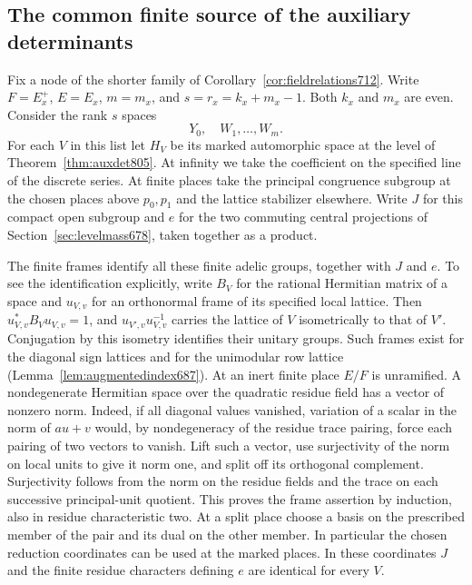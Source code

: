 \documentclass[a4paper,11pt]{article}
\theoremstyle{definition}
\theoremstyle{remark}
\numberwithin{equation}{section}
\begin{document}
\subsection{The common finite source of the auxiliary determinants}
\label{sec:commonsource806}
Fix a node of the shorter family of Corollary~\ref{cor:fieldrelations712}.
Write \(F=E_x^+\), \(E=E_x\), \(m=m_x\), and \(s=r_x=k_x+m_x-1\).
Both \(k_x\) and \(m_x\) are even. Consider the rank \(s\) spaces
\[
                         Y_0,\quad W_1,\ldots,W_m .
\]
For each \(V\) in this list let \(H_V\) be its marked automorphic
space at the level of Theorem~\ref{thm:auxdet805}. At infinity
we take the coefficient on the specified line of the discrete
series. At finite places take the principal congruence subgroup
at the chosen places above \(p_0,p_1\) and the lattice stabilizer
elsewhere. Write \(J\) for this compact open subgroup and \(e\)
for the two commuting central projections of
Section~\ref{sec:levelmass678}, taken together as a product.

The finite frames identify all these finite adelic groups, together
with \(J\) and \(e\). To see the identification explicitly, write
\(B_V\) for the rational Hermitian matrix of a space and \(u_{V,v}\)
for an orthonormal frame of its specified local lattice. Then
\(u_{V,v}^{*} B_V u_{V,v}=1\), and
\(u_{V',v}u_{V,v}^{-1}\) carries the lattice of \(V\) isometrically
to that of \(V'\). Conjugation by this isometry identifies their
unitary groups. Such frames exist for the diagonal sign lattices
and for the unimodular row lattice
(Lemma~\ref{lem:augmentedindex687}). At an inert finite place
\(E/F\) is unramified. A nondegenerate Hermitian space over
the quadratic residue field has a vector of nonzero norm.
Indeed, if all diagonal values vanished, variation of a scalar
in the norm of \(a u+v\) would, by nondegeneracy of the residue
trace pairing, force each pairing of two vectors to vanish.
Lift such a vector, use surjectivity of the norm on local units
to give it norm one, and split off its orthogonal complement.
Surjectivity follows from the norm on the residue fields and the
trace on each successive principal-unit quotient. This proves
the frame assertion by induction, also in residue characteristic
two. At a split place choose a basis on the prescribed member
of the pair and its dual on the other member. In particular the
chosen reduction coordinates can be used at the marked places.
In these coordinates \(J\) and the finite residue characters
defining \(e\) are identical for every \(V\).
\end{document}
